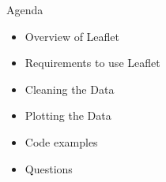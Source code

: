 \documentclass{beamer}
\begin{document}
\begin{frame}{
\begin{minipage}[t]{0.75\textwidth}
	Agenda
\end{minipage}
\hfill
\begin{minipage}[t]{0.25\textwidth}
	\flushright
\end{minipage}
}{}
\begin{center}
	\begin{itemize}
		\item Overview of Leaflet
		\item Requirements to use Leaflet
		\item Cleaning the Data
		\item Plotting the Data
		\item Code examples
		\item Questions
	\end{itemize}
\end{center}
\end{frame}
\end{document}
